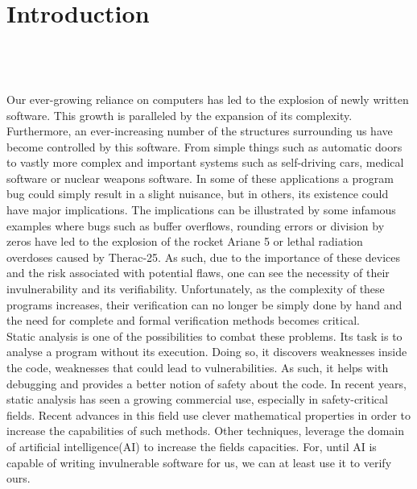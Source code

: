 
\setcounter{chapter}{0}

\chapter{Introduction}
\mbox{}\\
\mbox{}\\
\mbox{}\\
Our ever-growing reliance on computers has led to the explosion of newly written software. This growth is paralleled by the expansion of its complexity. Furthermore, an ever-increasing number of the structures surrounding us have become controlled by this software. From simple things such as automatic doors to vastly more complex and important systems such as self-driving cars, medical software or nuclear weapons software. In some of these applications a program bug could simply result in a slight nuisance, but in others, its existence could have major implications. The implications can be illustrated by some infamous examples where bugs such as buffer overflows, rounding errors or division by zeros have led to the explosion of the rocket Ariane 5 or lethal radiation overdoses caused by Therac-25. As such, due to the importance of these devices and the risk associated with potential flaws, one can see the necessity of their invulnerability and its verifiability. Unfortunately, as the complexity of these programs increases, their verification can no longer be simply done by hand and the need for complete and formal verification methods becomes critical.\\
Static analysis is one of the possibilities to combat these problems. Its task is to analyse a program without its execution. Doing so, it discovers weaknesses inside the code, weaknesses that could lead to vulnerabilities. As such, it helps with debugging and provides a better notion of safety about the code. In recent years, static analysis has seen a growing commercial use, especially in safety-critical fields. Recent advances in this field use clever mathematical properties in order to increase the capabilities of such methods. Other techniques, leverage the domain of artificial intelligence(AI) to increase the fields capacities. For, until AI is capable of writing invulnerable software for us, we can at least use it to verify ours.
